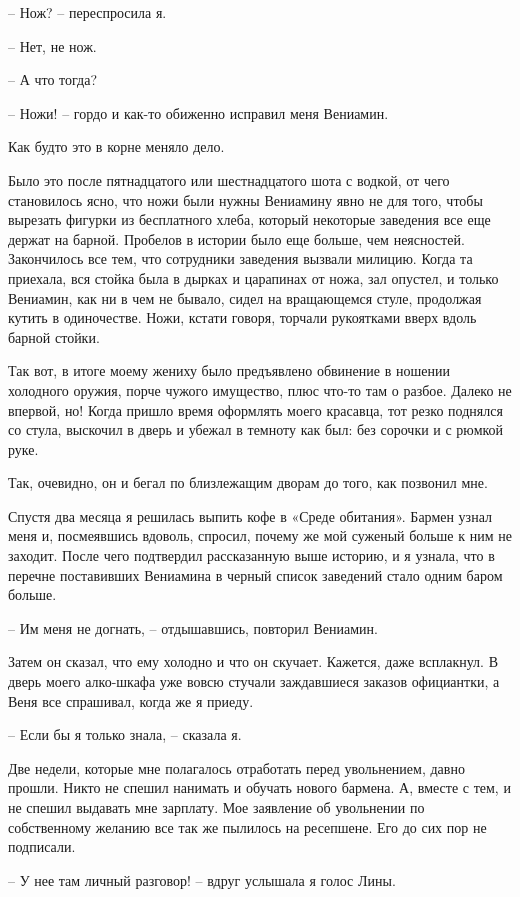 \documentclass[
]{book}
\begin{document}
-- Нож? -- переспросила я.

-- Нет, не нож.

-- А что тогда?

-- Ножи! -- гордо и как-то обиженно исправил меня Вениамин.

Как будто это в корне меняло дело.

Было это после пятнадцатого или шестнадцатого шота с водкой, от чего становилось ясно, что ножи были нужны Вениамину явно не для того, чтобы вырезать фигурки из бесплатного хлеба, который некоторые заведения все еще держат на барной. Пробелов в истории было еще больше, чем неясностей. Закончилось все тем, что сотрудники заведения вызвали милицию. Когда та приехала, вся стойка была в дырках и царапинах от ножа, зал опустел, и только Вениамин, как ни в чем не бывало, сидел на вращающемся стуле, продолжая кутить в одиночестве. Ножи, кстати говоря, торчали рукоятками вверх вдоль барной стойки.

Так вот, в итоге моему жениху было предъявлено обвинение в ношении холодного оружия, порче чужого имущество, плюс что-то там о разбое. Далеко не впервой, но! Когда пришло время оформлять моего красавца, тот резко поднялся со стула, выскочил в дверь и убежал в темноту как был: без сорочки и с рюмкой руке.

Так, очевидно, он и бегал по близлежащим дворам до того, как позвонил мне.

Спустя два месяца я решилась выпить кофе в «Среде обитания». Бармен узнал меня и, посмеявшись вдоволь, спросил, почему же мой суженый больше к ним не заходит. После чего подтвердил рассказанную выше историю, и я узнала, что в перечне поставивших Вениамина в черный список заведений стало одним баром больше.

-- Им меня не догнать, -- отдышавшись, повторил Вениамин.

Затем он сказал, что ему холодно и что он скучает. Кажется, даже всплакнул. В дверь моего алко-шкафа уже вовсю стучали заждавшиеся заказов официантки, а Веня все спрашивал, когда же я приеду.

-- Если бы я только знала, -- сказала я.

Две недели, которые мне полагалось отработать перед увольнением, давно прошли. Никто не спешил нанимать и обучать нового бармена. А, вместе с тем, и не спешил выдавать мне зарплату. Мое заявление об увольнении по собственному желанию все так же пылилось на ресепшене. Его до сих пор не подписали.

-- У нее там личный разговор! -- вдруг услышала я голос Лины.
\end{document}
